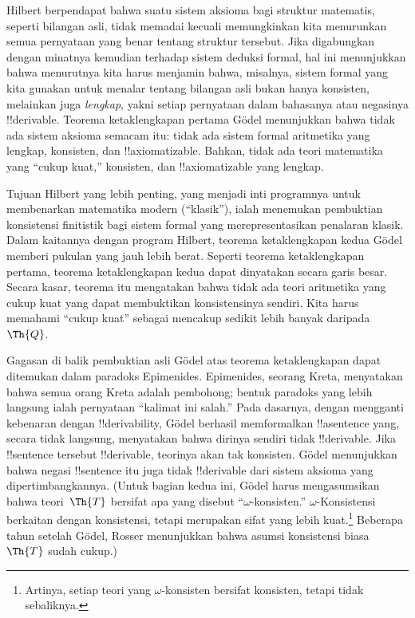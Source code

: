 \documentclass[../../../include/open-logic-section]{subfiles}
\begin{document}


Hilbert berpendapat bahwa suatu sistem aksioma bagi struktur matematis,
seperti bilangan asli, tidak memadai kecuali memungkinkan kita menurunkan
semua pernyataan yang benar tentang struktur tersebut. Jika digabungkan
dengan minatnya kemudian terhadap sistem deduksi formal, hal ini menunjukkan
bahwa menurutnya kita harus menjamin bahwa, misalnya, sistem formal yang kita
gunakan untuk menalar tentang bilangan asli bukan hanya konsisten, melainkan
juga \emph{lengkap}, yakni setiap pernyataan dalam bahasanya atau negasinya
!!{derivable}. Teorema ketaklengkapan pertama G\"odel menunjukkan bahwa tidak
ada sistem aksioma semacam itu: tidak ada sistem formal aritmetika yang
lengkap, konsisten, dan !!{axiomatizable}. Bahkan, tidak ada teori matematika
yang ``cukup kuat,'' konsisten, dan !!{axiomatizable} yang lengkap.

Tujuan Hilbert yang lebih penting, yang menjadi inti programnya untuk
membenarkan matematika modern (``klasik''), ialah menemukan pembuktian
konsistensi finitistik bagi sistem formal yang merepresentasikan penalaran
klasik. Dalam kaitannya dengan program Hilbert, teorema ketaklengkapan kedua
G\"odel memberi pukulan yang jauh lebih berat. Seperti teorema
ketaklengkapan pertama, teorema ketaklengkapan kedua dapat dinyatakan secara
garis besar. Secara kasar, teorema itu mengatakan bahwa tidak ada teori
aritmetika yang cukup kuat yang dapat membuktikan konsistensinya sendiri. Kita
harus memahami ``cukup kuat'' sebagai mencakup sedikit lebih banyak
daripada~$\Th{Q}$.

Gagasan di balik pembuktian asli G\"odel atas teorema ketaklengkapan dapat
ditemukan dalam paradoks Epimenides. Epimenides, seorang Kreta, menyatakan
bahwa semua orang Kreta adalah pembohong; bentuk paradoks yang lebih langsung
ialah pernyataan ``kalimat ini salah.'' Pada dasarnya, dengan mengganti
kebenaran dengan !!{derivability}, G\"odel berhasil memformalkan
!!a{sentence} yang, secara tidak langsung, menyatakan bahwa dirinya sendiri
tidak !!{derivable}. Jika !!{sentence} tersebut !!{derivable}, teorinya akan
tak konsisten. G\"odel menunjukkan bahwa negasi !!{sentence} itu juga tidak
!!{derivable} dari sistem aksioma yang dipertimbangkannya. (Untuk bagian
kedua ini, G\"odel harus mengasumsikan bahwa teori~$\Th{T}$ bersifat apa yang
disebut ``$\omega$-konsisten.'' $\omega$-Konsistensi berkaitan dengan
konsistensi, tetapi merupakan sifat yang lebih kuat.\footnote{Artinya, setiap
teori yang $\omega$-konsisten bersifat konsisten, tetapi tidak sebaliknya.}
Beberapa tahun setelah G\"odel, Rosser menunjukkan bahwa asumsi konsistensi
biasa~$\Th{T}$ sudah cukup.)
\end{document}
